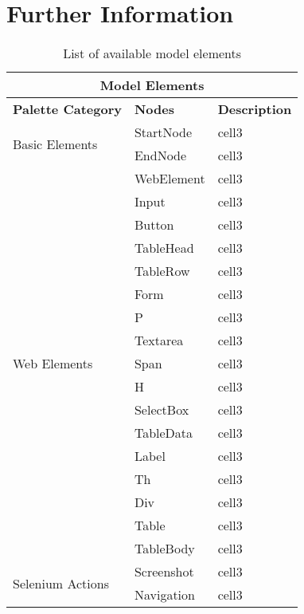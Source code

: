 \chapter{Further Information}

\begin{table}[H]
\caption{List of available model elements}
    \begin{tabular}{| l | l | p{8.2cm} |}
        \hline
        \multicolumn{3}{|c|}{\textbf{Model Elements}} \\
        \hline
        \textbf{Palette Category} & \textbf{Nodes} & \textbf{Description} \\
        \hline
        \multirow{2}{*}{Basic Elements} 
                & StartNode & cell3 \\\cline{2-3}
                & EndNode & cell3 \\
        \hline\hline
        \multirow{17}{*}{Web Elements} 
                & WebElement & cell3 \\\cline{2-3}
                & Input & cell3 \\\cline{2-3}
                & Button & cell3 \\\cline{2-3}
                & TableHead & cell3 \\\cline{2-3}
                & TableRow & cell3 \\\cline{2-3}
                & Form & cell3 \\\cline{2-3}
                & P & cell3 \\\cline{2-3}
                & Textarea & cell3 \\\cline{2-3}
                & Span & cell3 \\\cline{2-3}
                & H & cell3 \\\cline{2-3}
                & SelectBox & cell3 \\\cline{2-3}
                & TableData & cell3 \\\cline{2-3}
                & Label & cell3 \\\cline{2-3}
                & Th & cell3 \\\cline{2-3}
                & Div & cell3 \\\cline{2-3}
                & Table & cell3 \\\cline{2-3}
                & TableBody & cell3 \\\cline{2-3}
        \hline\hline
        \multirow{5}{*}{Selenium Actions} 
                & Screenshot & cell3 \\\cline{2-3}
                & Navigation & cell3 \\\cline{2-3}

\end{tabular}
\end{table}

